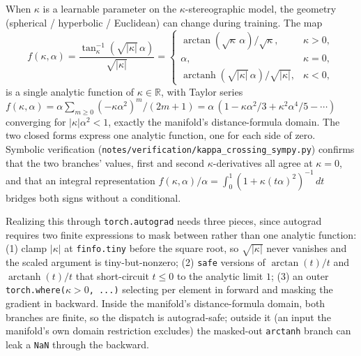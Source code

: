 \documentclass{article}
\newcommand{\R}{\mathbb{R}}
\newcommand{\kp}{\kappa}
\newcommand{\code}[1]{\texttt{#1}}
\begin{document}
When $\kp$ is a learnable parameter on the $\kp$-stereographic model, the
geometry (spherical / hyperbolic / Euclidean) can change during
training. The map
\begin{equation}
  f(\kp, \alpha) = \frac{\tan_\kp^{-1}(\sqrt{|\kp|}\,\alpha)}{\sqrt{|\kp|}}
  = \begin{cases}
    \arctan(\sqrt{\kp}\,\alpha)/\sqrt{\kp}, & \kp > 0,\\
    \alpha, & \kp = 0,\\
    \operatorname{arctanh}(\sqrt{|\kp|}\,\alpha)/\sqrt{|\kp|}, & \kp < 0,
  \end{cases}
  \label{eq:fkappa}
\end{equation}
is a single analytic function of $\kp \in \R$, with Taylor series
$f(\kp,\alpha) = \alpha\sum_{m\ge0}(-\kp\alpha^2)^m/(2m+1)
= \alpha\,(1 - \kp\alpha^2/3 + \kp^2\alpha^4/5 - \cdots)$ converging for
$|\kp|\alpha^2 < 1$, exactly the manifold's distance-formula domain.
The two closed forms express one analytic function, one for each side of
zero. Symbolic verification
(\code{notes/verification/kappa\_crossing\_sympy.py}) confirms that the
two branches' values, first and second $\kp$-derivatives all agree at
$\kp = 0$, and that an integral representation
$f(\kp,\alpha)/\alpha = \int_0^1 (1+\kp(t\alpha)^2)^{-1}\,dt$ bridges both
signs without a conditional.

Realizing this through \code{torch.autograd} needs three pieces, since
autograd requires two finite expressions to mask between rather than one
analytic function: (1) clamp $|\kp|$ at \code{finfo.tiny} before the
square root, so $\sqrt{|\kp|}$ never vanishes and the scaled argument is
tiny-but-nonzero; (2) \code{safe} versions of $\arctan(t)/t$ and
$\operatorname{arctanh}(t)/t$ that short-circuit $t \le 0$ to the
analytic limit $1$; (3) an outer \code{torch.where(}$\kp>0$\code{, ...)}
selecting per element in forward and masking the gradient in backward.
Inside the manifold's distance-formula domain, both branches are finite,
so the dispatch is autograd-safe; outside it (an input the manifold's
own domain restriction excludes) the masked-out \code{arctanh} branch
can leak a \code{NaN} through the backward.
\end{document}
